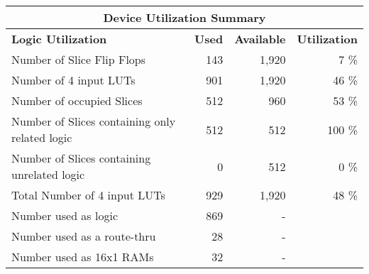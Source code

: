 \vspace{10pt}
\begin{table}[!htbp]
\centering
    \begin{tabular}{|l|r|r|r|}
    \hline
    \multicolumn{4}{|c|}{\textbf{Device Utilization Summary}}                                                                                                                 \\ \hline
    \textbf{Logic Utilization}                     & \multicolumn{1}{l|}{\textbf{Used}} & \multicolumn{1}{l|}{\textbf{Available}} & \multicolumn{1}{l|}{\textbf{Utilization}} \\ \hline
    Number of Slice Flip Flops                     & 143                                & 1,920                                   & 7 \%                                      \\ \hline
    Number of 4 input LUTs                         & 901                                & 1,920                                   & 46 \%                                     \\ \hline
    Number of occupied Slices                      & 512                                & 960                                     & 53 \%                                     \\ \hline
    Number of Slices containing only related logic & 512                                & 512                                     & 100 \%                                    \\ \hline
    Number of Slices containing unrelated logic    & 0                                  & 512                                     & 0 \%                                      \\ \hline
    Total Number of 4 input LUTs                   & 929                                & 1,920                                   & 48 \%                                     \\ \hline
    Number used as logic                           & 869                                & -                                       &                                           \\ \hline
    Number used as a route-thru                    & 28                                 & -                                       &                                           \\ \hline
    Number used as 16x1 RAMs                       & 32                                 & -                                       &                                           \\ \hline

\end{tabular}
\end{table}
